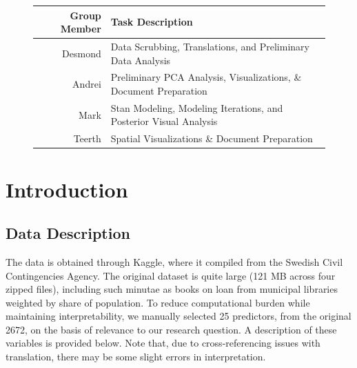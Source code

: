 \documentclass[10pt,a4paper, hidelinks]{article} %
\begin{document}
\begin{figure}[H]
	\centering
	\begin{tabular}{rp{11cm}}
		\toprule
		Group Member & Task Description \\
		\midrule
		Desmond & Data Scrubbing, Translations, and Preliminary Data Analysis\\
		Andrei & Preliminary PCA Analysis, Visualizations, \& Document Preparation\\
		Mark & Stan Modeling, Modeling Iterations, and Posterior Visual Analysis\\
		Teerth & Spatial Visualizations \& Document Preparation\\
		\bottomrule
	\end{tabular}
\end{figure}

\tableofcontents

\thispagestyle{empty}
\newpage

\section{Introduction}

\subsection{Data Description}
The data is obtained through Kaggle, where it compiled from the Swedish Civil Contingencies Agency.  The original dataset is quite large (121 MB across four zipped files), including such minutae as books on loan from municipal libraries weighted by share of population.  To reduce computational burden while maintaining interpretability, we manually selected 25 predictors, from the original 2672, on the basis of relevance to our research question.  A description of these variables is provided below.  Note that, due to cross-referencing issues with translation, there may be some slight errors in interpretation.
\end{document}
